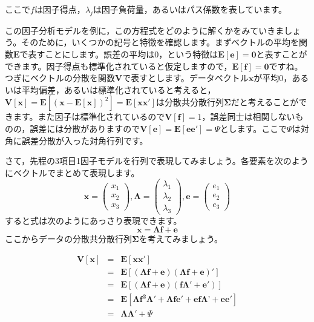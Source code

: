 \documentclass{ltjsbook}
\begin{document}
ここで$f$は因子得点，$\lambda_j$は因子負荷量，あるいはパス係数を表しています。

この因子分析モデルを例に，この方程式をどのように解くかをみていきましょう。そのために，いくつかの記号と特徴を確認します。まずベクトルの平均を関数$\bm{E}$で表すことにします。誤差の平均は0，という特徴は$\bm{E} \left[ \bm{e} \right] = \bm{0}$と表すことができます。因子得点も標準化されていると仮定しますので，$\bm{E} \left[ \bm{f}\right] = \bm{0}$ですね。つぎにベクトルの分散を関数$\bm{V}$で表すとします。データベクトル$\bm{x}$が平均0，あるいは平均偏差，あるいは標準化されていると考えると，$\bm{V} \left [ \bm{x} \right] =\bm{E} \left[ ( \bm{x} - \bm{E}\left[ \bm{x} \right] )^2 \right ] = \bm{E} \left [ \bm{xx'}\right]$は分散共分散行列$\bm{\Sigma}$だと考えることができます。また因子は標準化されているので$\bm{V}\left [ \bm{f} \right ] = 1$，誤差同士は相関しないものの，誤差には分散がありますので$\bm{V}\left[ \bm{e} \right]=\bm{E} \left[ \bm{ee'}\right] = \Psi$とします。ここで$\Psi$は対角に誤差分散が入った対角行列です。

さて，先程の3項目1因子モデルを行列で表現してみましょう。各要素を次のようにベクトルでまとめて表現します。
\[ \bm{x} = \begin{pmatrix} x_1\\x_2\\x_3 \end{pmatrix}, \bm{\Lambda} = \begin{pmatrix} \lambda_1\\ \lambda_2 \\ \lambda_3 \end{pmatrix}, \bm{e} = \begin{pmatrix} e_1 \\ e_2 \\ e_3 \end{pmatrix} \]
すると式は次のようにあっさり表現できます。
\[ \bm{x} = \bm{\Lambda} \bm{f} + \bm{e} \]
ここからデータの分散共分散行列$\bm{\Sigma}$を考えてみましょう。

\begin{eqnarray*}
    \bm{V}\left[ \bm{x} \right] &=& \bm{E}\left[ \bm{xx'}\right]\\
                                                &=& \bm{E}\left[ (\bm{\Lambda f}+\bm{e}) (\bm{\Lambda f}+\bm{e})' \right] \\
                                                &=& \bm{E}\left[ (\bm{\Lambda f}+\bm{e}) (\bm{f \Lambda' }+\bm{e'}) \right] \\
                                                &=& \bm{E}\left[ \bm{ \Lambda f^2 \Lambda' + \Lambda f e'  + ef\Lambda’ + ee' } \right] \\
                                                &=& \bm{\Lambda \Lambda'} + \Psi \\
\end{eqnarray*}
\end{document}
